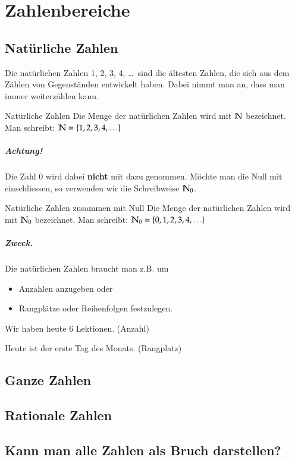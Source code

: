\chapter{Zahlenbereiche}
\section{Natürliche Zahlen}
Die natürlichen Zahlen 1, 2, 3, 4, \ldots ~sind die ältesten Zahlen, die sich aus dem Zählen von Gegenständen entwickelt haben.
Dabei nimmt man an, dass man immer weiterzählen kann.\\

\begin{defn}{Natürliche Zahlen}
	Die Menge der natürlichen Zahlen wird mit $\mathbb{N}$ bezeichnet.
	Man schreibt: $\mathbb{N} = \{ 1, 2, 3, 4, \ldots \}$
\end{defn}

\paragraph{Achtung!}
Die Zahl 0 wird dabei {\bfseries nicht} mit dazu genommen.
Möchte man die Null mit einschliessen, so verwenden wir die Schreibweise $\mathbb{N}_0$.\\

\begin{defn}{Natürliche Zahlen zusammen mit Null}
	Die Menge der natürlichen Zahlen wird mit $\mathbb{N}_0$ bezeichnet.
	Man schreibt: $\mathbb{N}_0 = \{ 0, 1, 2, 3, 4, \ldots \}$
\end{defn}

\paragraph{Zweck.}
Die natürlichen Zahlen braucht man z.B. um
\begin{itemize}
	\item Anzahlen anzugeben oder
	\item Rangplätze oder Reihenfolgen festzulegen.
\end{itemize}

\begin{example}
	Wir haben heute 6 Lektionen. (Anzahl)
\end{example}
\begin{example}
	Heute ist der erste Tag des Monats. (Rangplatz)
\end{example}

\section{Ganze Zahlen}
\section{Rationale Zahlen}
\section{Kann man alle Zahlen als Bruch darstellen?}

